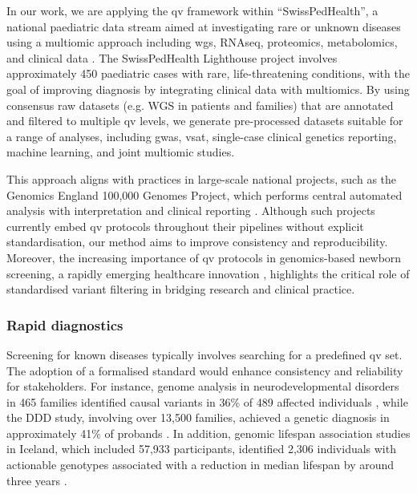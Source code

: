 In our work, we are applying the \ac{qv} framework within ``SwissPedHealth'', a national paediatric data stream aimed at investigating rare or unknown diseases using a multiomic approach including \ac{wgs}, RNAseq, proteomics, metabolomics, and clinical data \cite{mozun2024paediatric}. The SwissPedHealth Lighthouse project involves approximately 450 paediatric cases with rare, life-threatening conditions, with the goal of improving diagnosis by integrating clinical data with multiomics. By using consensus raw datasets (e.g. WGS in patients and families) that are annotated and filtered to multiple \ac{qv} levels, we generate pre-processed datasets suitable for a range of analyses, including \ac{gwas}, \ac{vsat}, single-case clinical genetics reporting, machine learning, and joint multiomic studies.


This approach aligns with practices in large-scale national projects, such as the Genomics England 100,000 Genomes Project, which performs central automated analysis with interpretation and clinical reporting \cite{turnbull2018100}. Although such projects currently embed \ac{qv} protocols throughout their pipelines without explicit standardisation, our method aims to improve consistency and reproducibility. Moreover, the increasing importance of \ac{qv} protocols in genomics-based newborn screening, a rapidly emerging healthcare innovation \cite{noauthor_every_2024}, highlights the critical role of standardised variant filtering in bridging research and clinical practice.

\subsubsection{Rapid diagnostics}
Screening for known diseases typically involves searching for a predefined \ac{qv} set. The adoption of a formalised standard would enhance consistency and reliability for stakeholders. For instance, genome analysis in neurodevelopmental disorders in 465 families identified causal variants in 36\% of 489 affected individuals \citep{sanchis2023genome}, while the DDD study, involving over 13,500 families, achieved a genetic diagnosis in approximately 41\% of probands \cite{wright2023genomic}. In addition, genomic lifespan association studies in Iceland, which included 57,933 participants, identified 2,306 individuals with actionable genotypes associated with a reduction in median lifespan by around three years \citep{jensson2023actionable}.

